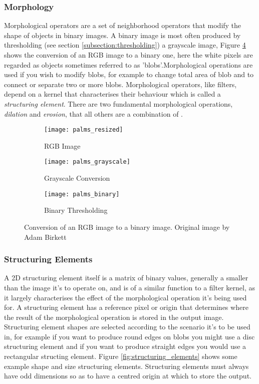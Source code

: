 \subsubsection{Morphology}
\label{subsubsection:morphology}
Morphological operators are a set of neighborhood operators that modify the shape of objects in binary images. A binary image is most often produced by thresholding (see section \ref{subsection:thresholding}) a grayscale image, Figure \ref{fig:thresholding} shows the conversion of an RGB image to a binary one, here the white pixels are regarded as objects sometimes referred to as 'blobs'.Morphological operations are used if you wish to modify blobs, for example to change total area of blob and to connect or separate two or more blobs. Morphological operators, like filters, depend on a kernel that characterises their behaviour which is called a \emph{structuring element}. There are two fundamental morphological operations, \emph{dilation} and \emph{erosion}, that all others are a combination of \cite{morph_textbook}. 

\begin{figure}[htbp]
    \centering
    \begin{subfigure}[b]{0.3\textwidth}
        \texttt{[image: palms\_resized]}
        \caption{RGB Image}
        \label{fig:emu_noise}
    \end{subfigure}
    \begin{subfigure}[b]{0.3\textwidth}
        \texttt{[image: palms\_grayscale]}
        \caption{Grayscale Conversion}
        \label{fig:emu_gauss}
    \end{subfigure}
    \begin{subfigure}[b]{0.3\textwidth}
        \texttt{[image: palms\_binary]}
        \caption{Binary Thresholding}
        \label{fig:emu_median}
    \end{subfigure}
    \captionsetup{format = hang}
    \caption{Conversion of an RGB image to a binary image. Original image by Adam Birkett}
    \label{fig:thresholding}
\end{figure}

\subsubsection{Structuring Elements}

A 2D structuring element itself is a matrix of binary values, generally a smaller than the image it's to operate on, and is of a similar function to a filter kernel, as it largely characterises the effect of the morphological operation it's being used for. A structuring element has a reference pixel or origin that determines where the result of the morphological operation is stored in the output image. Structuring element shapes are selected according to the scenario it's to be used in, for example if you want to produce round edges on blobs you might use a disc structuring element and if you want to produce straight edges you would use a rectangular structing element. Figure \ref{fig:structuring_elements} shows some example shape and size structuring elements. Structuring elements must always have odd dimensions so as to have a centred origin at which to store the output.

